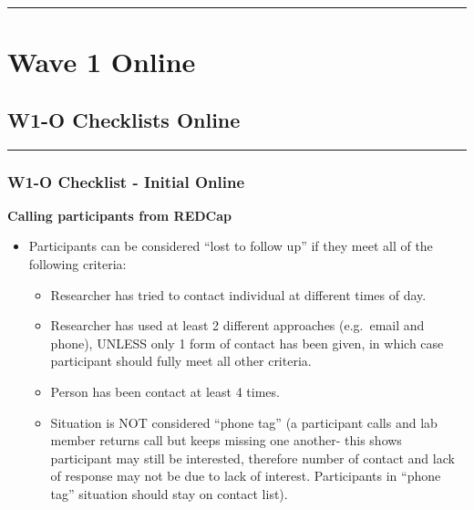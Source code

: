 \documentclass[]{book}
\providecommand{\tightlist}{%
  \setlength{\itemsep}{0pt}\setlength{\parskip}{0pt}}
\begin{document}
\begin{center}\rule{0.5\linewidth}{0.5pt}\end{center}

\hypertarget{wave-1-online}{%
\chapter{Wave 1 Online}\label{wave-1-online}}

\hypertarget{w1-o-checklists-online}{%
\section{W1-O Checklists Online}\label{w1-o-checklists-online}}

\begin{center}\rule{0.5\linewidth}{0.5pt}\end{center}

\hypertarget{w1-o-checklist---initial-online}{%
\subsection{W1-O Checklist - Initial Online}\label{w1-o-checklist---initial-online}}

\textbf{Calling participants from REDCap}

\begin{itemize}
\tightlist
\item
  Participants can be considered ``lost to follow up'' if they meet all of the following criteria:

  \begin{itemize}
  \tightlist
  \item
    Researcher has tried to contact individual at different times of day.
  \item
    Researcher has used at least 2 different approaches (e.g.~email and phone), UNLESS only 1 form of contact has been given, in which case participant should fully meet all other criteria.
  \item
    Person has been contact at least 4 times.
  \item
    Situation is NOT considered ``phone tag'' (a participant calls and lab member returns call but keeps missing one another- this shows participant may still be interested, therefore number of contact and lack of response may not be due to lack of interest. Participants in ``phone tag'' situation should stay on contact list).
  \end{itemize}
\end{itemize}
\end{document}
